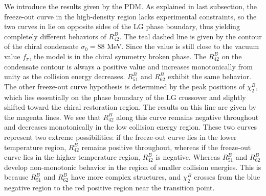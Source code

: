 \documentclass[aps,twocolumn,prd,superscriptaddress,nofootinbib,floatfix]{revtex4-2}
\def\Fig#1{\Cref{#1}}
\begin{document}
We introduce the results given by the PDM. As explained in last subsection, the freeze-out curve in the high-density region lacks experimental constraints, so the two curves in \Fig{fig:phasePDM_all} lie on opposite sides of the LG phase boundary, thus yielding completely different behaviors of $R^B_{42}$. The teal dashed line is given by the contour of the chiral condensate $\sigma_0=88$ MeV. Since the value is still close to the vacuum value $f_\pi$, the model is in the chiral symmetry broken phase. The $R^B_{42}$ on the condensate contour is always a positive value and increases monotonically from unity as the collision energy decreases. $R^B_{51}$ and $R^B_{62}$ exhibit the same behavior. The other freeze-out curve hypothesis is determined by the peak positions of $\chi^B_2$, which lies essentially on the phase boundary of the LG crossover and slightly shifted toward the chiral restoration region. The results on this line are given by the magenta lines. We see that $R^B_{42}$ along this curve remains negative throughout and decreases monotonically in the low collision energy region. These two curves represent two extreme possibilities: if the freeze-out curve lies in the lower temperature region, $R^B_{42}$ remains positive throughout, whereas if the freeze-out curve lies in the higher temperature region, $R^B_{42}$ is negative. Whereas $R^B_{51}$ and $R^B_{62}$ develop non-monotonic behavior in the region of smaller collision energies. This is because $R^B_{51}$ and $R^B_{62}$ have more complex structures, and $\chi^B_2$ crosses from the blue negative region to the red positive region near the transition point.
\end{document}
